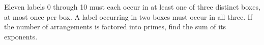 Eleven labels 0 through 10 must each occur in at least one of three distinct boxes, at most once per box. A label occurring in two boxes must occur in all three. If the number of arrangements is factored into primes, find the sum of its exponents.
